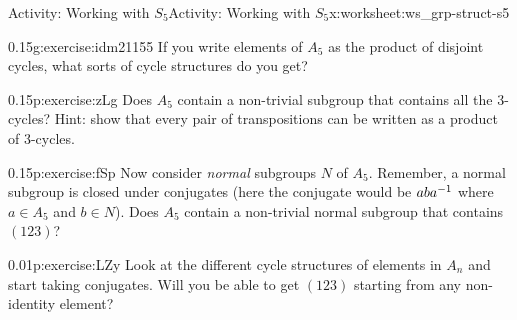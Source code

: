 \documentclass[11pt]{book}
\begin{document}
\begin{worksheet-subsection}{Activity: Working with \(S_5\)}{}{Activity: Working with \(S_5\)}{}{}{x:worksheet:ws_grp-struct-s5}
\begin{divisionexercise}{6}{}{0.15}{g:exercise:idm21155}%
If you write elements of \(A_5\) as the product of disjoint cycles, what sorts of cycle structures do you get?%
\end{divisionexercise}%
\begin{divisionexercise}{7}{}{0.15}{p:exercise:zLg}%
Does \(A_5\) contain a non-trivial subgroup that contains all the 3-cycles? Hint: show that every pair of transpositions can be written as a product of 3-cycles.%
\end{divisionexercise}%
\begin{divisionexercise}{8}{}{0.15}{p:exercise:fSp}%
Now consider \emph{normal} subgroups \(N\) of \(A_5\).  Remember, a normal subgroup is closed under conjugates (here the conjugate would be  \(aba^{-1}\) where \(a \in A_5\) and \(b \in N\)). Does \(A_5\) contain a non-trivial normal subgroup that contains \((123)\)?%
\end{divisionexercise}%
\begin{divisionexercise}{9}{}{0.01}{p:exercise:LZy}%
Look at the different cycle structures of elements in \(A_n\) and start taking conjugates.  Will you be able to get \((123)\) starting from any non-identity element?%
\end{divisionexercise}%
\end{worksheet-subsection}
\restoregeometry
\end{document}
